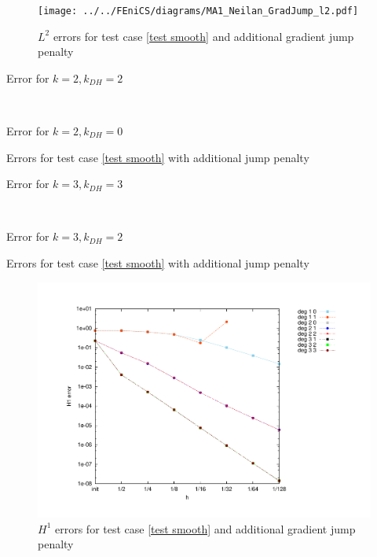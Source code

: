 \begin{figure}[h!]
\centering
	\texttt{[image: ../../FEniCS/diagrams/MA1\_Neilan\_GradJump\_l2.pdf]}
	\caption{$L^2$ errors for test case \ref{test smooth} and additional gradient jump penalty}
	\label{fig: l2 errors test 1 jump}
\end{figure}
\begin{table}[H]
	\begin{subtable}[b]{0.4\textwidth}
		\centering
		\pgfplotstabletypeset[
		columns={iterations, l2error, h1error,N},
		every row 0 column 0/.style={set content=init},
		]\MAOneJumpdegTwoTwo
		\caption{Error for $k=2, k_{DH}=2$}
	\end{subtable}
	~
	\begin{subtable}[b]{0.4\textwidth}
		\centering
		\pgfplotstabletypeset[columns={iterations, l2error, h1error,N},
		every row 0 column 0/.style={set content=init},
		]\MAOneJumpdegTwoZero
		\caption{Error for $k=2, k_{DH}=0$}
	\end{subtable}
	\caption{Errors for test case \ref{test smooth} with additional jump penalty}
	\label{tab: l2 errors test 1 deg 2 jump}
\end{table}
\begin{table}[h]
	\begin{subtable}[b]{0.45\textwidth}
		\centering
		\pgfplotstabletypeset[
		columns={iterations, l2error, h1error,N},
		every row 0 column 0/.style={set content=init},
		]\MAOneJumpdegThreeThree
		\caption{Error for $k=3, k_{DH}=3$}
	\end{subtable}
	~
	\begin{subtable}[b]{0.45\textwidth}
		\centering
		\pgfplotstabletypeset[columns={iterations, l2error, h1error,N},
		every row 0 column 0/.style={set content=init},
		]\MAOneJumpdegThreeTwo
		\caption{Error for $k=3, k_{DH}=2$}
	\end{subtable}
	\caption{Errors for test case \ref{test smooth} with additional jump penalty}
	\label{tab: l2 errors test 1 deg 3 jump}
\end{table}

\begin{figure}[H]
\centering
	\includegraphics[scale =0.45]{plots/MA1_Neilan_GradJump_h1.pdf}
	\caption{$H^1$ errors for test case \ref{test smooth} and additional gradient jump penalty}
	\label{fig: h1 errors test 1 jump}
\end{figure}

